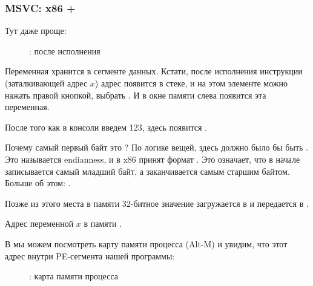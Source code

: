 \clearpage
\subsubsection{MSVC: x86 + \olly}
\myindex{\olly}

Тут даже проще:

\begin{figure}[H]
\centering
{}
\caption{\olly: после исполнения \scanf}
\label{fig:scanf_ex2_olly_1}
\end{figure}

Переменная хранится в сегменте данных.
Кстати, после исполнения инструкции \PUSH (заталкивающей адрес $x$) адрес появится в стеке, 
и на этом элементе можно нажать правой кнопкой, выбрать .
И в окне памяти слева появится эта переменная.

После того как в консоли введем 123, здесь появится .

Почему самый первый байт это ?
По логике вещей, здесь должно было бы быть .
Это называется \gls{endianness}, и в x86 принят формат .
Это означает, что в начале записывается самый младший байт, а заканчивается самым старшим байтом.
Больше об этом: .

Позже из этого места в памяти 32-битное значение загружается в \EAX и передается в \printf.

Адрес переменной $x$ в памяти .

\clearpage
\label{olly_memory_map_example}

В \olly{} мы можем посмотреть карту памяти процесса (Alt-M) и увидим, что этот адрес
внутри PE-сегмента  нашей программы:

\begin{figure}[H]
\centering
{}
\caption{\olly: карта памяти процесса}
\label{fig:scanf_ex2_olly_2}
\end{figure}
